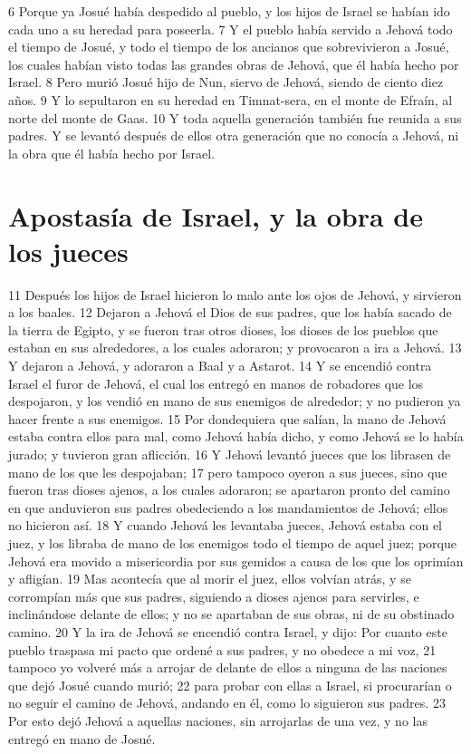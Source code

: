 6 Porque ya Josué había despedido al pueblo, y los hijos de Israel se habían ido cada uno a su heredad para poseerla.
7 Y el pueblo había servido a Jehová todo el tiempo de Josué, y todo el tiempo de los ancianos que sobrevivieron a Josué, los cuales habían visto todas las grandes obras de Jehová, que él había hecho por Israel.
8 Pero murió Josué hijo de Nun, siervo de Jehová, siendo de ciento diez años.
9 Y lo sepultaron en su heredad en Timnat-sera, en el monte de Efraín, al norte del monte de Gaas.
10 Y toda aquella generación también fue reunida a sus padres. Y se levantó después de ellos otra generación que no conocía a Jehová, ni la obra que él había hecho por Israel.

\section*{Apostasía de Israel, y la obra de los jueces}

11 Después los hijos de Israel hicieron lo malo ante los ojos de Jehová, y sirvieron a los baales.
12 Dejaron a Jehová el Dios de sus padres, que los había sacado de la tierra de Egipto, y se fueron tras otros dioses, los dioses de los pueblos que estaban en sus alrededores, a los cuales adoraron; y provocaron a ira a Jehová.
13 Y dejaron a Jehová, y adoraron a Baal y a Astarot.
14 Y se encendió contra Israel el furor de Jehová, el cual los entregó en manos de robadores que los despojaron, y los vendió en mano de sus enemigos de alrededor; y no pudieron ya hacer frente a sus enemigos.
15 Por dondequiera que salían, la mano de Jehová estaba contra ellos para mal, como Jehová había dicho, y como Jehová se lo había jurado; y tuvieron gran aflicción.
16 Y Jehová levantó jueces que los librasen de mano de los que les despojaban;
17 pero tampoco oyeron a sus jueces, sino que fueron tras dioses ajenos, a los cuales adoraron; se apartaron pronto del camino en que anduvieron sus padres obedeciendo a los mandamientos de Jehová; ellos no hicieron así.
18 Y cuando Jehová les levantaba jueces, Jehová estaba con el juez, y los libraba de mano de los enemigos todo el tiempo de aquel juez; porque Jehová era movido a misericordia por sus gemidos a causa de los que los oprimían y afligían. 
19 Mas acontecía que al morir el juez, ellos volvían atrás, y se corrompían más que sus padres, siguiendo a dioses ajenos para servirles, e inclinándose delante de ellos; y no se apartaban de sus obras, ni de su obstinado camino.
20 Y la ira de Jehová se encendió contra Israel, y dijo: Por cuanto este pueblo traspasa mi pacto que ordené a sus padres, y no obedece a mi voz,
21 tampoco yo volveré más a arrojar de delante de ellos a ninguna de las naciones que dejó Josué cuando murió;
22 para probar con ellas a Israel, si procurarían o no seguir el camino de Jehová, andando en él, como lo siguieron sus padres.
23 Por esto dejó Jehová a aquellas naciones, sin arrojarlas de una vez, y no las entregó en mano de Josué.

